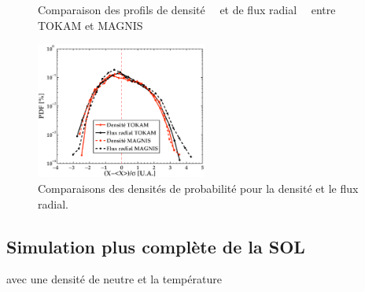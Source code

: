\begin{refsection}
\begin{figure}[htbp]
  \centering
    \caption{Comparaison des profils de
    densité~~ et de flux
    radial~~ entre TOKAM et MAGNIS}
    \label{pandas}
\end{figure}

\begin{figure}[htbp]
\centering
\includegraphics[width=0.5\textwidth]{figures/4-TokamPDFDensite.eps}
{\caption{Comparaisons des densités de probabilité pour la densité et
le flux radial.}
\label{4-TokamPDFDensite}}
\end{figure}

\subsection{Simulation plus complète de la SOL}
 avec une densité de neutre et la température
%
%
	
\end{refsection}
